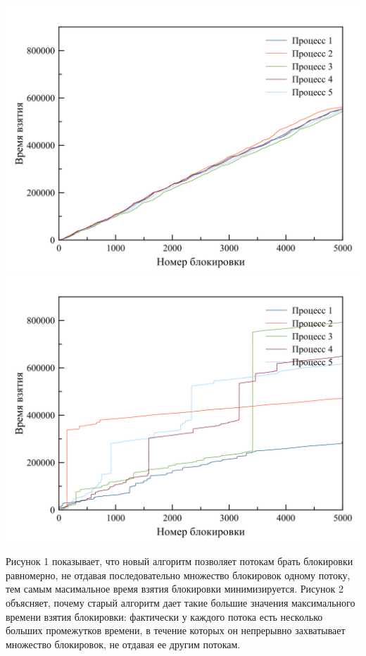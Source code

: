 \includegraphics[width=\textwidth]{5_new.png}
\includegraphics[width=\textwidth]{5_old.png}

Рисунок 1 показывает, что новый алгоритм позволяет потокам брать блокировки равномерно, не отдавая последовательно множество блокировок одному потоку, тем самым масимальное время взятия блокировки минимизируется. Рисунок 2 объясняет, почему старый алгоритм дает такие большие значения максимального времени взятия блокировки: фактически у каждого потока есть несколько больших промежутков времени, в течение которых он непрерывно захватывает множество блокировок, не отдавая ее другим потокам. 